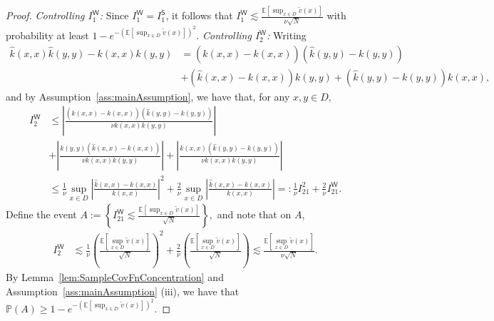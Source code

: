 \documentclass[10pt,a4paper]{amsart}
\newcommand{\E}{\mathbb{E}}
\renewcommand{\P}{\mathbb{P}}
\newcommand{\abs}[1]{\ensuremath{\left\lvert #1 \right\rvert}}
\newcommand{\hatk}{\hat{k}}
\newcommand{\inbraces}[1]{\left\{#1\right\}}           %
\newcommand{\inparen}[1]{\left(#1\right)}             %
\newcommand{\tildev}{\tilde{v}}
\begin{document}
\begin{proof}
    \textit{Controlling $I^{\mathsf{W}}_1$:} 
    Since $I^{\mathsf{W}}_1 = I^{\mathsf{S}}_1$, it follows that $I^{\mathsf{W}}_1 \lesssim \frac{\E[\sup_{x\in D} \tildev(x)]}{\nu \sqrt{N}}$ with probability at least $1 -e^{-(\E[\sup_{x \in D} \tildev(x)])^2}$.
    \textit{Controlling $I^{\mathsf{W}}_2$:} 
    Writing
    \begin{align*}
        \hatk(x,x)\hatk(y,y) - k(x,x)k(y,y)
        &= (\hatk(x,x)-k(x,x))(\hatk(y,y)-k(y,y))\\ 
        &+ (\hatk(x,x)-k(x,x))k(y,y) + (\hatk(y,y)-k(y,y))k(x,x),
    \end{align*}
    and by Assumption~\ref{ass:mainAssumption}, we have that, for any $x,y \in D,$
    \begin{align*}
        I^{\mathsf{W}}_2
        &\le         
        \abs{\frac{(\hatk(x,x) - k(x,x))(\hatk(y,y) - k(y,y)) }{\nu k(x,x)k(y,y)}} \\
        &+
        \abs{\frac{k(y,y) ( \hatk(x,x) - k(x,x)) }{\nu k(x,x)k(y,y)}} 
        + 
        \abs{\frac{k(x,x)(\hatk(y,y) - k(y,y))}{\nu k(x,x)k(y,y)}}\\
        &\le 
        \frac{1}{\nu} \sup_{x\in D} \abs{\frac{\hatk(x,x) - k(x,x) }{k(x,x)}}^2
        + \frac{2}{\nu} \sup_{x \in D}
        \abs{\frac{\hatk(x,x) - k(x,x) }{k(x,x)}} 
        =: \frac{1}{\nu} I^2_{21}+ \frac{2}{\nu} I^{\mathsf{W}}_{21}.
    \end{align*}
    Define the event $A :=\inbraces{ I^{\mathsf{W}}_{21} \lesssim \frac{\E[\sup_{x\in D} \tildev(x)]}{\sqrt{N} } },$ and note that on $A$,  
    \begin{align*}
        I^{\mathsf{W}}_2 
        & 
        \lesssim
        \frac{1}{\nu}
        \inparen{
         \frac{\E[\sup_{x\in D} \tildev(x)]}{\sqrt{N}}
        }^2 + \frac{2}{\nu} \inparen{\frac{\E[\sup_{x\in D} \tildev(x)]}{\sqrt{N}}} \lesssim
        \frac{\E[\sup_{x\in D} \tildev(x)]}{\nu \sqrt{N}}.
    \end{align*}
    By Lemma~\ref{lem:SampleCovFnConcentration} and Assumption~\ref{ass:mainAssumption} (iii), we have that $\P(A) \ge 1-e^{- (\E[\sup_{x \in D} \tildev(x)])^2}.$
\end{proof}
\end{document}
